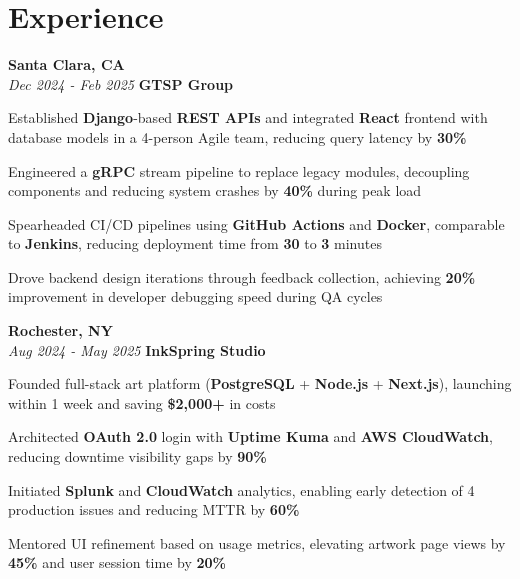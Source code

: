 \section{Experience}

\begin{twocolentry}{
    \textbf{Santa Clara, CA} \\
    \textit{Dec 2024 - Feb 2025}
}{
    \textbf{GTSP Group} \\
}
\end{twocolentry}
\begin{onecolentry}
    \begin{highlights}
        \item Established \textbf{Django}-based \textbf{REST APIs} and integrated \textbf{React} frontend with database models in a 4-person Agile team, reducing query latency by \textbf{30\%}
        \item Engineered a \textbf{gRPC} stream pipeline to replace legacy modules, decoupling components and reducing system crashes by \textbf{40\%} during peak load
        \item Spearheaded CI/CD pipelines using \textbf{GitHub Actions} and \textbf{Docker}, comparable to \textbf{Jenkins}, reducing deployment time from \textbf{30} to \textbf{3} minutes
        \item Drove backend design iterations through feedback collection, achieving \textbf{20\%} improvement in developer debugging speed during QA cycles
    \end{highlights}
\end{onecolentry}

\vspace{0.2cm}

\begin{twocolentry}{
    \textbf{Rochester, NY} \\
    \textit{Aug 2024 - May 2025}
}{
    \textbf{InkSpring Studio} \\
}
\end{twocolentry}
\begin{onecolentry}
    \begin{highlights}
        \item Founded full-stack art platform (\textbf{PostgreSQL} + \textbf{Node.js} + \textbf{Next.js}), launching within 1 week and saving \textbf{\$2,000+} in costs
        \item Architected \textbf{OAuth 2.0} login with \textbf{Uptime Kuma} and \textbf{AWS CloudWatch}, reducing downtime visibility gaps by \textbf{90\%}
        \item Initiated \textbf{Splunk} and \textbf{CloudWatch} analytics, enabling early detection of 4 production issues and reducing MTTR by \textbf{60\%}
        \item Mentored UI refinement based on usage metrics, elevating artwork page views by \textbf{45\%} and user session time by \textbf{20\%}
    \end{highlights}
\end{onecolentry}

